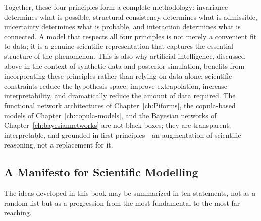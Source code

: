 Together, these four principles form a complete methodology: invariance determines what is possible, structural consistency determines what is admissible, uncertainty determines what is probable, and interaction determines what is connected. A model that respects all four principles is not merely a convenient fit to data; it is a genuine scientific representation that captures the essential structure of the phenomenon. This is also why artificial intelligence, discussed above in the context of synthetic data and posterior simulation, benefits from incorporating these principles rather than relying on data alone: scientific constraints reduce the hypothesis space, improve extrapolation, increase interpretability, and dramatically reduce the amount of data required. The functional network architectures of Chapter~\ref{ch:Piforms}, the copula-based models of Chapter~\ref{ch:copula-models}, and the Bayesian networks of Chapter~\ref{ch:bayesiannetworks} are not black boxes; they are transparent, interpretable, and grounded in first principles—an augmentation of scientific reasoning, not a replacement for it.

\subsection{A Manifesto for Scientific Modelling}

The ideas developed in this book may be summarized in ten statements, not as a random list but as a progression from the most fundamental to the most far-reaching.

